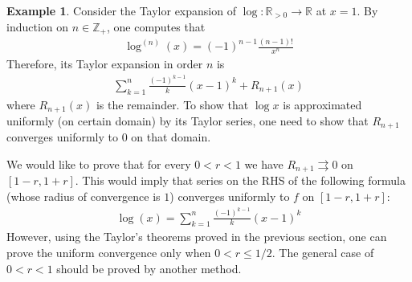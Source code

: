 \documentclass[12pt,b5paper,notitlepage]{article}
\theoremstyle{definition}
\newtheorem{eg}[df]{Example}
\theoremstyle{plain}
\newcommand{\Zbb}{\mathbb Z}
\newcommand{\Rbb}{\mathbb R}
\numberwithin{equation}{section}
\begin{document}
\begin{eg}
Consider the Taylor expansion of $\log:\Rbb_{>0}\rightarrow\Rbb$ at $x=1$. By induction on $n\in\Zbb_+$, one computes that
\begin{align*}
\log^{(n)}(x)=(-1)^{n-1}\frac{(n-1)!}{x^n}
\end{align*}
Therefore, its Taylor expansion in order $n$ is
\begin{align*}
\sum_{k=1}^n \frac{(-1)^{k-1}}{k} (x-1)^k+R_{n+1}(x)
\end{align*}
where $R_{n+1}(x)$ is the remainder. To show that $\log x$ is approximated uniformly (on certain domain) by its Taylor series, one need to show that $R_{n+1}$ converges uniformly to $0$ on that domain. 

We would like to prove that for every $0<r<1$ we have $R_{n+1}\rightrightarrows 0$ on $[1-r,1+r]$. This would imply that series on the RHS of the following formula (whose radius of convergence is $1$) converges uniformly to $f$ on $[1-r,1+r]$:
\begin{align}
\log(x)=\sum_{k=1}^n \frac{(-1)^{k-1}}{k} (x-1)^k
\end{align}
However, using the Taylor's theorems proved in the previous section, one can prove the uniform convergence only when $0<r\leq1/2$. The general case of $0<r<1$ should be proved by another method.   \hfill\qedsymbol
\end{eg}
\end{document}
